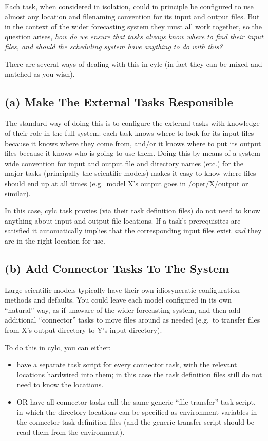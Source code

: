 \documentclass[11pt,a4paper]{article}
\begin{document}
Each task, when considered in isolation, could in principle be
configured to use almost any location and filenaming convention for its
input and output files. But in the context of the wider forecasting
system they must all work together, so the question arises, {\em how do
we ensure that tasks always know where to find their input files, and
should the scheduling system have anything to do with this?} 

There are several ways of dealing with this in cylc (in fact they can
be mixed and matched as you wish). 

\subsection{(a) Make The External Tasks Responsible }

The standard way of doing this is to configure the external tasks with
knowledge of their role in the full system: each task knows where to
look for its input files because it knows where they come from, and/or
it knows where to put its output files because it knows who is going to
use them. Doing this by means of a system-wide convention for input and
output file and directory names (etc.) for the major tasks (principally
the scientific models) makes it easy to know where files should end up
at all times (e.g.\ model X's output goes in /oper/X/output or similar).

In this case, cylc task proxies (via their task definition files) do not
need to know anything about input and output file locations. If a task's
prerequisites are satisfied it automatically implies that the
corresponding input files exist {\em and} they are in the right location
for use.

\subsection{(b) Add Connector Tasks To The System} 

Large scientific models typically have their own idiosyncratic
configuration methods and defaults. You could leave each model
configured in its own ``natural'' way, as if unaware of the wider
forecasting system, and then add additional ``connector'' tasks to move
files around as needed (e.g.\ to transfer files from X's output
directory to Y's input directory).

To do this in cylc, you can either:

\begin{itemize}
    \item have a separate task script for every connector task, with the
        relevant locations hardwired into them; in this case the task
        definition files still do not need to know the locations.
    \item OR have all connector tasks call the same generic ``file
        transfer'' task script, in which the directory locations can be
        specified as environment variables in the connector task
        definition files (and the generic transfer script should be read
        them from the environment).
\end{itemize}
\end{document}
